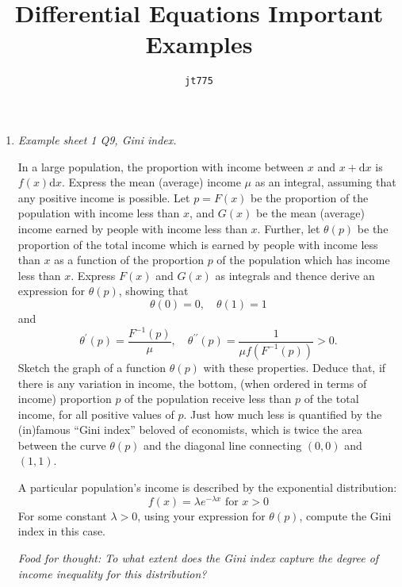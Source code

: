 \documentclass[11pt]{article}
\title{\textbf{Differential Equations Important Examples}}
\author{\texttt{jt775}}
\date{\null}
\newlength{\qspace}
\newcounter{qnumber}
\newenvironment{question}%
 {\vspace{\qspace}
  \begin{enumerate}[\bfseries 1\quad][10]%
    \setcounter{enumi}{\value{qnumber}}%
    \item%
 }
{
  \end{enumerate}
  \filbreak
  \stepcounter{qnumber}
 }
\begin{document}
\maketitle
\vspace{-1.5cm}
\begin{question}\textit{Example sheet 1 Q9, Gini index.}

    In a large population, the proportion with income between $x$ and $x+\mathrm{d} x$ is $f(x) \mathrm{d} x$. Express the mean (average) income $\mu$ as an integral, assuming that any positive income is possible.
    Let $p=F(x)$ be the proportion of the population with income less than $x$, and $G(x)$ be the mean (average) income earned by people with income less than $x$. Further, let $\theta(p)$ be the proportion of the total income which is earned by people with income less than $x$ as a function of the proportion $p$ of the population which has income less than $x .$ Express $F(x)$ and $G(x)$ as integrals and thence derive an expression for $\theta(p)$, showing that
    \[
    \theta(0)=0, \quad \theta(1)=1
    \]
    and 
    \[
    \theta^{\prime}(p)=\frac{F^{-1}(p)}{\mu}, \quad \theta^{\prime \prime}(p)=\frac{1}{\mu f\left(F^{-1}(p)\right)}>0.
    \]
    Sketch the graph of a function $\theta(p)$ with these properties. Deduce that, if there is any variation in income, the bottom, (when ordered in terms of income) proportion $p$ of the population receive less than $p$ of the total income, for all positive values of $p$. Just how much less is quantified by the (in)famous ``Gini index'' beloved of economists, which is twice the area between the curve $\theta(p)$ and the diagonal line connecting $(0,0)$ and $(1,1)$.
    
    A particular population's income is described by the exponential distribution:
    \[
    f(x)=\lambda e^{-\lambda x} \text { for } x>0
    \]
    For some constant $\lambda>0$, using your expression for $\theta(p)$, compute the Gini index in this case. 
    
    \textit{Food for thought: To what extent does the Gini index capture the degree of income inequality for this distribution?}
\end{question}
\end{document}
